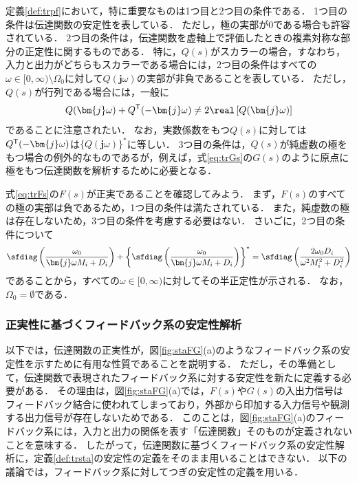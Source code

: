 \documentclass[a4j,10pt,oneside,openany,dvipdfmx]{jsbook}
\begin{document}
定義\ref{def:trpf}において，特に重要なものは1つ目と2つ目の条件である．
1つ目の条件は伝達関数の安定性を表している．
ただし，極の実部が0である場合も許容されている．
2つ目の条件は，伝達関数を虚軸上で評価したときの複素対称な部分の正定性に関するものである．
特に，$Q(s)$がスカラーの場合，すなわち，入力と出力がどちらもスカラーである場合には，2つ目の条件はすべての$\omega \in [0,\infty)\setminus \Omega_0$に対して$Q(\bm{j}\omega)$の実部が非負であることを表している．
ただし，$Q(s)$が行列である場合には，一般に
\[
Q(\bm{j} \omega) + Q^{\sf T}(-\bm{j} \omega) \neq 2 \real\left[ Q(\bm{j} \omega) \right]
\]
であることに注意されたい．
なお，実数係数をもつ$Q(s)$に対しては$Q^{\sf T}( -\bm{j} \omega)$は$\{Q(\bm{j} \omega)\}^*$に等しい．
3つ目の条件は，$Q(s)$が純虚数の極をもつ場合の例外的なものであるが，例えば，式\eqref{eq:trGs}の$G(s)$のように原点に極をもつ伝達関数を解析するために必要となる．

\begin{example}\label{ex:Fspr1}
式\eqref{eq:trFs}の$F(s)$が正実であることを確認してみよう．
まず，$F(s)$のすべての極の実部は負であるため，1つ目の条件は満たされている．
また，純虚数の極は存在しないため，3つ目の条件を考慮する必要はない．
さいごに，2つ目の条件について
\[
\sfdiag \left( 
\frac{\omega_0}{ \bm{j} \omega M_i + D_i}
\right)
+
\left\{
\sfdiag \left( 
\frac{\omega_0}{\bm{j} \omega M_i + D_i}
\right)
\right\}^*
=
\sfdiag \left( 
\frac{2 \omega_0 D_i}{\omega^2 M_i^2 + D_i^2}
\right)
\]
であることから，すべての$\omega\in [0,\infty)$に対してその半正定性が示される．
なお，$\Omega_0=\emptyset$である．
\end{example}

\subsubsection{正実性に基づくフィードバック系の安定性解析}

以下では，伝達関数の正実性が，図\ref{fig:staFG}(a)のようなフィードバック系の安定性を示すために有用な性質であることを説明する．
ただし，その準備として，伝達関数で表現されたフィードバック系に対する安定性を新たに定義する必要がある．
その理由は，図\ref{fig:staFG}(a)では，$F(s)$や$G(s)$の入出力信号はフィードバック結合に使われてしまっており，外部から印加する入力信号や観測する出力信号が存在しないためである．
このことは，図\ref{fig:staFG}(a)のフィードバック系には，入力と出力の関係を表す「伝達関数」そのものが定義されないことを意味する．
したがって，伝達関数に基づくフィードバック系の安定性解析に，定義\ref{def:trsta}の安定性の定義をそのまま用いることはできない．
以下の議論では，フィードバック系に対してつぎの安定性の定義を用いる．
\end{document}
